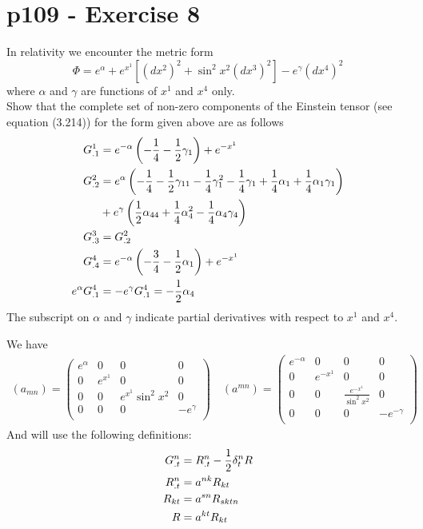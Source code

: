 \section{p109 - Exercise 8}
\begin{tcolorbox}
In relativity we encounter the metric form $$ \Phi= e^{\alpha} + e^{x^1}\left[ \left( dx^2 \right)^2 + \sin^2 x^2 \left(dx^3 \right)^2 \right] - e^{\gamma}\left(dx^4\right)^2$$ where $\alpha$ and $\gamma$ are functions of $x^1$ and $x^4$ only.\\
Show that the complete set of non-zero components of the Einstein tensor (see equation (3.214)) for the form given above are as follows
\begin{align*}
G^1_{.1} &= e^{-\alpha}\left( -\frac{1}{4} -\frac{1}{2}\gamma_1\right) + e^{-x^1}\\
G^2_{.2} &= e^{\alpha} \left(-\frac{1}{4} - \frac{1}{2} \gamma_{11} - \frac{1}{4} \gamma_1^2 -\frac{1}{4}\gamma_1+\frac{1}{4} \alpha _1 +\frac{1}{4} \alpha _1 \gamma_1 \right) \\
&+e^{\gamma} \left(\frac{1}{2} \alpha_{44} + \frac{1}{4}\alpha_4^2 -\frac{1}{4}\alpha_4\gamma_4\right)\\
G^3_{.3} &= G^2_{.2} \\
G^4_{.4} &= e^{-\alpha}\left( -\frac{3}{4} -\frac{1}{2}\alpha_1\right) + e^{-x^1}\\
 e^{\alpha} G^4_{.1} &= -e^{\gamma} G^4_{.1} = -\frac{1}{2} \alpha_4
\end{align*}
The subscript on $\alpha$ and $\gamma$ indicate partial derivatives with respect to $x^1$ and $x^4$.
\end{tcolorbox}
We have 
\begin{align}
\left(a_{mn}\right)= \begin{pmatrix}
 e^{\alpha}& 0&0&0 \\
 0& e^{x^1} &0&0\\
 0& 0 &e^{x^1}\sin^2 x^2&0\\
 0& 0 &0&-e^{\gamma}\\
\end{pmatrix}\quad 
\left(a^{mn}\right)= \begin{pmatrix}
 {e^{-\alpha}}& 0&0&0 \\
 0& {e^{-x^1}} &0&0\\
 0& 0 &\frac{e^{-x^1}}{\sin^2 x^2}&0\\
 0& 0 &0&-{e^{-\gamma}}\\
\end{pmatrix}
\end{align}
And will use the following definitions:
\begin{align}
 G^n_{.t} &= R^n_{.t} - \frac{1}{2} \delta^n_t R\\
 R^n_{.t} &= a^{nk}R_{kt}\\
 R_{kt} &= a^{sn}R_{sktn}\\
 R &= a^{kt}R_{kt}
\end{align}
